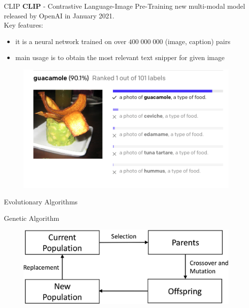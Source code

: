 \documentclass[t]{beamer}
\begin{document}
\begin{frame}{CLIP}
\textbf{CLIP} - Contrastive Language-Image Pre-Training new multi-modal model released by OpenAI in January 2021.  \\
Key features:
\begin{itemize}
\item it is a neural network trained on over $400 \; 000 \; 000$ (image, caption) pairs
\item main usage is to obtain the most relevant text snipper for given image
\end{itemize}
\begin{figure}[ht!]
    \centering
    \includegraphics[scale=0.3]{clip_example.png}
\end{figure} 
\end{frame}
\begin{frame}[c]{Evolutionary Algorithms}
\begin{block}{Genetic Algorithm}
\begin{figure}[ht!]
    \centering
    \includegraphics[scale=0.9]{gen-algo.jpg}
\end{figure} 
\end{block}
\end{frame}
\end{document}
